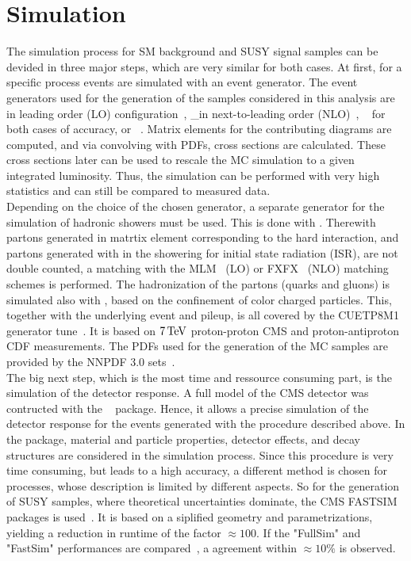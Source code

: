 \section{Simulation}
The simulation process for SM background and SUSY signal samples can be devided in three major steps, which are very similar for both cases. At first, for a specific process events are simulated with an event generator. The event generators used for the generation of the samples considered in this analysis are  in leading order (LO) configuration~\cite{Madgraph1,Madgraph2,Madgraph3}, \MADGRAPH\_\MCATNLO in next-to-leading order (NLO)~\cite{Madgraph1,AMCATNLO}, \PYTHIA~\cite{Pythia} for both cases of accuracy, or \POWHEG~\cite{Powheg1,Powheg2}. Matrix elements for the contributing diagrams are computed, and via convolving with PDFs, cross sections are calculated. These cross sections later can be used to rescale the MC simulation to a given integrated luminosity. Thus, the simulation can be performed with very high statistics and can still be compared to measured data.\\
Depending on the choice of the chosen generator, a separate generator for the simulation of hadronic showers must be used. This is done with \PYTHIA. Therewith partons generated in matrtix element corresponding to the hard interaction, and partons generated with \PYTHIA in the showering for \eg initial state radiation (ISR), are not double counted, a matching with the \textsc{MLM}~\cite{Madgraph2} (LO) or \textsc{FXFX}~\cite{AMCATNLO} (NLO) matching schemes is performed. The hadronization of the partons (quarks and gluons) is simulated also with \PYTHIA, based on the confinement of color charged particles.  This, together with the underlying event and pileup, is all covered by the \textsc{CUETP8M1} generator tune~\cite{Tune}. It is based on $7\,\text{Te\hspace{-.08em}V}$ proton-proton CMS and proton-antiproton CDF measurements. The PDFs used for the generation of the MC samples are provided by the \textsc{NNPDF} 3.0 sets~\cite{NNPDF}.\\
The big next step, which is the most time and ressource consuming part, is the simulation of the detector response. A full model of the CMS detector was contructed with the \GEANTfour~\cite{Geant} package. Hence, it allows a precise simulation of the detector response for the events generated with the procedure described above. In the \GEANTfour package, material and particle properties, detector effects, and decay structures are considered in the simulation process. Since this procedure is very time consuming, but leads to a high accuracy, a different method is chosen for processes, whose description is limited by different aspects. So for the generation of SUSY samples, where theoretical uncertainties dominate, the CMS \textsc{FASTSIM} packages is used~\cite{FastSim}. It is based on a siplified geometry and parametrizations, yielding a reduction in runtime of the factor $\approx100$. If the "FullSim" and "FastSim" performances are compared~\cite{FastSimQuality}, a agreement within $\approx10\%$ is observed.\\
